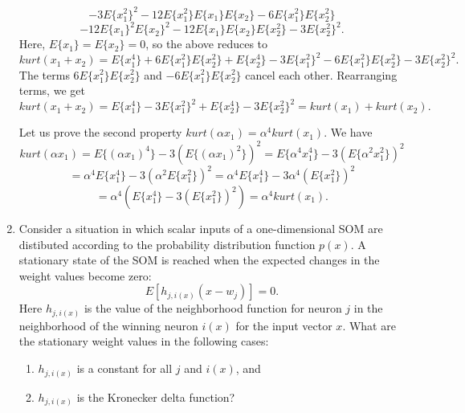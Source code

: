 \begin{enumerate}
\begin{solution}
    \begin{displaymath}
      -3 E\{x_1^2\}^2 -12 E\{x_1^2\} E\{x_1\}E\{x_2\} -6 E\{x_1^2\} E\{x_2^2\}
    \end{displaymath}
    \begin{displaymath}
      -12 E\{x_1\}^2 E\{x_2\}^2 -12 E\{x_1\}E\{x_2\} E\{x_2^2\} -3 E\{x_2^2\}^2 .
    \end{displaymath}
    Here, $E\{x_1\}=E\{x_2\}=0$, so the above reduces to
    \begin{displaymath}
      kurt(x_1+x_2)
      = E\{x_1^4\} + 6 E\{x_1^2\}E\{x_2^2\}
      + E\{x_2^4\}
      -3 E\{x_1^2\}^2
      -6 E\{x_1^2\} E\{x_2^2\}  -3 E\{x_2^2\}^2 .
    \end{displaymath}
    The terms $6 E\{x_1^2\}E\{x_2^2\}$ and $-6 E\{x_1^2\}E\{x_2^2\}$ cancel each other.
    Rearranging terms, we get
    \begin{displaymath}
      kurt(x_1+x_2)
      = E\{x_1^4\} -3 E\{x_1^2\}^2 + E\{x_2^4\} -3 E\{x_2^2\}^2
      = kurt(x_1) + kurt(x_2) .
    \end{displaymath}

    Let us prove the second property $kurt(\alpha x_1) = \alpha^4 kurt(x_1)$.
    We have
    \begin{displaymath}
      kurt(\alpha x_1)
      = E\{(\alpha x_1)^4\} - 3(E\{(\alpha x_1)^2\})^2
      = E\{\alpha^4 x_1^4\} - 3(E\{\alpha^2 x_1^2\})^2
    \end{displaymath}
    \begin{displaymath}
      = \alpha^4 E\{x_1^4\} - 3(\alpha^2 E\{x_1^2\})^2
      = \alpha^4 E\{x_1^4\} - 3\alpha^4 (E\{x_1^2\})^2
    \end{displaymath}
    \begin{displaymath}
      = \alpha^4 (E\{x_1^4\} - 3(E\{x_1^2\})^2)
      = \alpha^4 kurt(x_1).
    \end{displaymath}


  \end{solution}

  
\item Consider a situation in which scalar inputs of a
  one-dimensional SOM are distibuted according to the probability
  distribution function $p(x)$. A stationary state
  of the SOM is reached when the expected changes in the weight
  values become zero:
  \begin{equation*}
    E[h_{j,i(x)}(x-w_j)]=0 \mbox{.}
  \end{equation*}
  Here $h_{j,i(x)}$ is the value of the neighborhood function for neuron $j$ in the neighborhood
  of the winning neuron $i(x)$ for the input vector $x$.
  What are the stationary weight values in the following cases: \begin{enumerate}
  \item $h_{j,i(x)}$ is a constant for all $j$ and $i(x)$, and
  \item $h_{j,i(x)}$ is the Kronecker delta function?
  \end{enumerate}


\end{enumerate}
